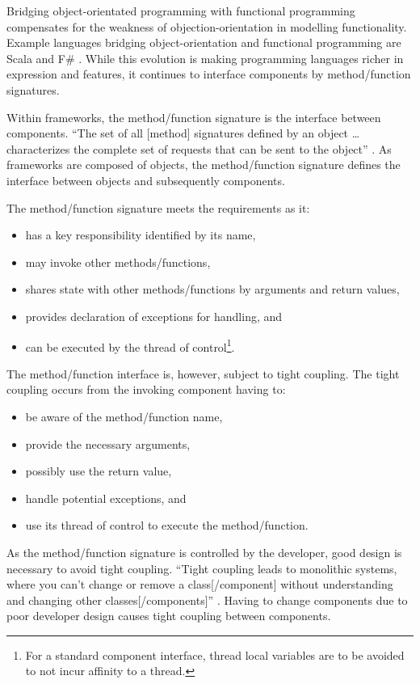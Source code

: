 \documentclass[prodmode]{style/acmlarge}
\begin{document}
Bridging object-orientated programming with functional programming
\cite{bridging-function-oo} compensates for the weakness of
objection-orientation in modelling functionality.  Example languages bridging
object-orientation and functional programming are Scala \cite{scala} and F\#
\cite{f-sharp}.  While this evolution is making programming languages richer in
expression and features, it continues to interface components by method/function
signatures.

Within frameworks, the method/function signature is the interface between
components.  ``The set of all [method] signatures defined by an object \ldots
characterizes the complete set of requests that can be sent to the object''
\cite[p. 13]{gof}.  As frameworks are composed of objects, the method/function
signature defines the interface between objects and subsequently components.

The method/function signature meets the requirements as it:
\begin{itemize}
  \item has a key responsibility identified by its name,
  \item may invoke other methods/functions,
  \item shares state with other methods/functions by arguments and return values,
  \item provides declaration of exceptions for handling, and
  \item can be executed by the thread of control\footnote{For a standard component interface, thread local variables are to be avoided to not incur affinity to a thread.}.
\end{itemize}

The method/function interface is, however, subject to tight coupling.  The tight
coupling occurs from the invoking component having to:
\begin{itemize}
  \item be aware of the method/function name,
  \item provide the necessary arguments,
  \item possibly use the return value,
  \item handle potential exceptions, and
  \item use its thread of control to execute the method/function.
\end{itemize}

As the method/function signature is controlled by the developer, good design is
necessary to avoid tight coupling.  ``Tight coupling leads to monolithic
systems, where you can't change or remove a class[/component] without
understanding and changing other classes[/components]'' \cite[p. 24-25]{gof}.
Having to change components due to poor developer design causes tight coupling
between components.
\end{document}
